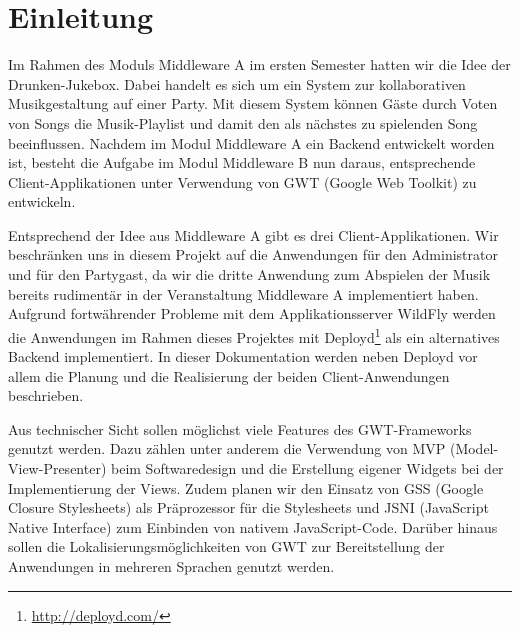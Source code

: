 \section{Einleitung}
Im Rahmen des Moduls Middleware A im ersten Semester hatten wir die Idee der Drunken-Jukebox. Dabei handelt es sich um ein System zur kollaborativen Musikgestaltung auf einer Party. Mit diesem System können Gäste durch Voten von Songs die Musik-Playlist und damit den als nächstes zu spielenden Song beeinflussen. Nachdem im Modul Middleware A ein Backend entwickelt worden ist, besteht die Aufgabe im Modul Middleware B nun daraus, entsprechende Client-Applikationen unter Verwendung von GWT (Google Web Toolkit) zu entwickeln.

Entsprechend der Idee aus Middleware A gibt es drei Client-Applikationen. Wir beschränken uns in diesem Projekt auf die Anwendungen für den Administrator und für den Partygast, da wir die dritte Anwendung zum Abspielen der Musik bereits rudimentär in der Veranstaltung Middleware A implementiert haben. Aufgrund fortwährender Probleme mit dem Applikationsserver WildFly werden die Anwendungen im Rahmen dieses Projektes mit Deployd\footnote{\url{http://deployd.com/}} als ein alternatives Backend implementiert. In dieser Dokumentation werden neben Deployd vor allem die Planung und die Realisierung der beiden Client-Anwendungen beschrieben.

Aus technischer Sicht sollen möglichst viele Features des GWT-Frameworks genutzt werden. Dazu zählen unter anderem die Verwendung von MVP (Model-View-Presenter) beim Softwaredesign und die Erstellung eigener Widgets bei der Implementierung der Views. Zudem planen wir den Einsatz von GSS (Google Closure Stylesheets) als Präprozessor für die Stylesheets und JSNI (JavaScript Native Interface) zum Einbinden von nativem JavaScript-Code. Darüber hinaus sollen die Lokalisierungsmöglichkeiten von GWT zur Bereitstellung der Anwendungen in mehreren Sprachen genutzt werden.